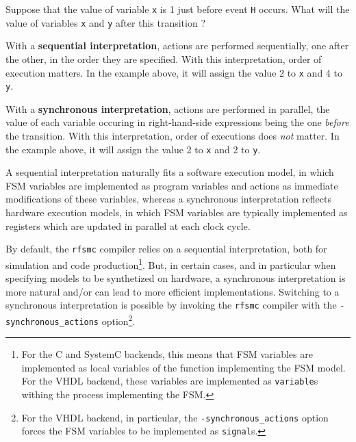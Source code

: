 Suppose that the value of variable \verb|x| is 1 just before event \verb|H| occurs. What will the value of
variables \verb|x| and \verb|y| after this transition ?

\step With a \textbf{sequential interpretation}, actions are performed sequentially, one after the
other, in the order they are specified. With this interpretation, order of execution matters. In the example above, it will
assign the value 2 to \verb|x| and 4 to \verb|y|.

\step With a \textbf{synchronous interpretation}, actions are performed in parallel, the value of each variable
occuring in right-hand-side expressions being the one \emph{before} the transition. With this
interpretation, order of executions does \emph{not} matter. In the example above, it will
assign the value 2 to \verb|x| and 2 to \verb|y|.

\medskip
A sequential interpretation naturally fits a software execution model, in which FSM variables are
implemented as program variables and actions as immediate modifications of these variables, whereas
a synchronous interpretation reflects hardware execution models, in which FSM variables are
typically implemented as registers which are updated in parallel at each clock cycle.

\medskip
By default, the \verb|rfsmc| compiler relies on a sequential interpretation, both for simulation and
code production\footnote{For the C and SystemC backends, this means that FSM variables are
  implemented as local variables of the function implementing the FSM model. For the VHDL backend,
  these variables are implemented as \texttt{variable}s withing the process implementing the
  FSM.}. But, in certain cases, and in particular when specifying models to be synthetized on
hardware, a synchronous interpretation is more natural and/or can lead to more efficient
implementations. Switching to a synchronous interpretation is possible by invoking the \verb|rfsmc|
compiler with the \verb|-synchronous_actions| option\footnote{For the VHDL backend, in particular, the
  \texttt{-synchronous\_actions} option forces the FSM variables to be implemented as
  \texttt{signal}s.}.  


